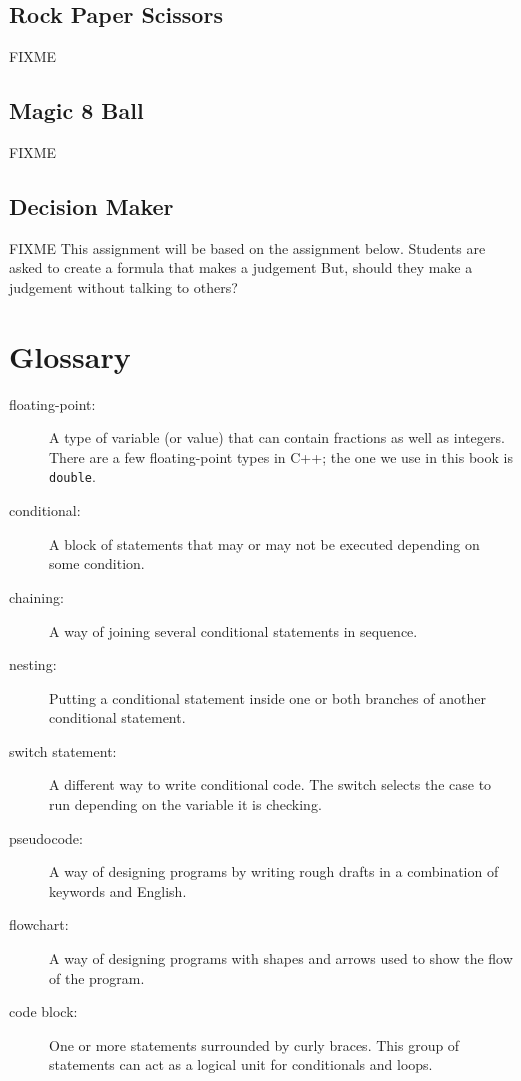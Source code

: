 \subsection{Rock Paper Scissors}
FIXME
\subsection{Magic 8 Ball}
FIXME
\subsection{Decision Maker}
FIXME
This assignment will be based on the assignment below.
Students are asked to create a formula that makes a judgement
But, should they make a judgement without talking to others?


\section{Glossary}

\begin{description}
\item[floating-point:] A type of variable (or value) that can contain
fractions as well as integers.  There are a few floating-point types
in C++; the one we use in this book is {\tt double}.

\item[conditional:]  A block of statements that may or may not
be executed depending on some condition.

\item[chaining:]  A way of joining several conditional statements
in sequence.

\item[nesting:] Putting a conditional statement inside one or both
branches of another conditional statement.

\item[switch statement:] A different way to write conditional code. The switch selects the case to run depending on the variable it is checking.

\item[pseudocode:]  A way of designing programs by writing
rough drafts in a combination of keywords and English.

\item[flowchart:] A way of designing programs with shapes and arrows used to show the flow of the program. 

\item[code block:] One or more statements surrounded by curly braces. This group of statements can act as a logical unit for conditionals and loops.

\end{description}


